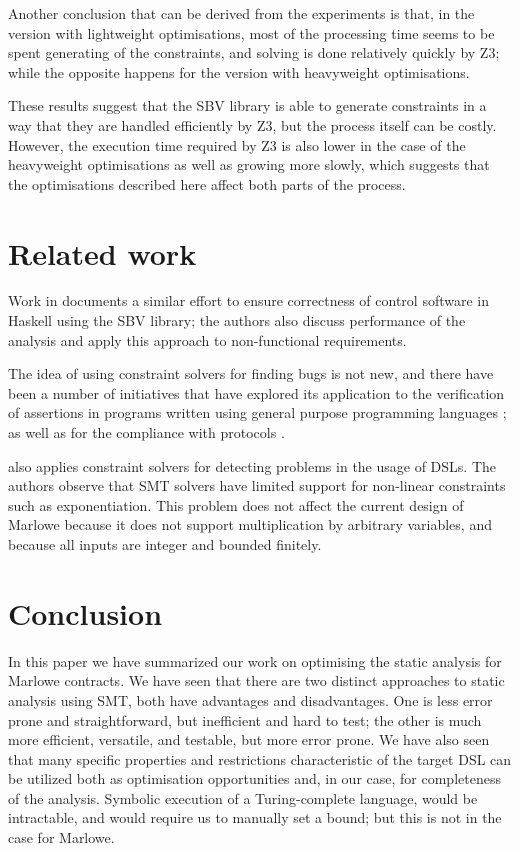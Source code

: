 \documentclass[english,runningheads]{llncs}
\begin{document}
Another conclusion that can be derived from the experiments is that, in the
version with lightweight optimisations, most of the processing time seems to be
spent generating of the constraints, and solving is done relatively
quickly by Z3; while the opposite happens for the version with heavyweight
optimisations.

These results suggest that the SBV library is able to generate constraints in a way
that they are handled efficiently by Z3, but the process itself can be costly. However, the  execution time required by Z3
is also lower in the case of the heavyweight optimisations as well as
growing more slowly, which suggests that the optimisations described here
affect both parts of the process.

\section{Related work}

Work in \cite{mokhov2019formal} documents a similar effort to ensure
correctness of control software in Haskell using the SBV library; the
authors also discuss performance of the analysis and apply this approach
to non-functional requirements.

The idea of using constraint solvers for finding bugs is not new,
and there have been a number of initiatives that have explored its
application to the verification of assertions in programs written
using general purpose programming languages \cite{gulwani2008program,jackson2000finding};
as well as for the compliance with protocols
\cite{ball2001automatically,xie2005saturn}.

\cite{keshishzadeh2013early} also applies constraint solvers for
detecting problems in the usage of DSLs. The authors observe that
SMT solvers have limited support for non-linear constraints such as
exponentiation. This problem does not affect the current design of
Marlowe because it does not support multiplication by arbitrary variables,
and because all inputs are integer and bounded finitely.




\section{Conclusion}

In this paper we have summarized our work
on optimising the static analysis for Marlowe contracts. We have seen
that there are two distinct approaches to static analysis using SMT,
both have advantages and disadvantages. One is less error prone and
straightforward, but inefficient and hard to test; the other 
is much more efficient, versatile, and testable, but more error prone.
We have also seen that many specific properties and restrictions characteristic
of the target DSL can be utilized both as optimisation opportunities
and, in our case, for completeness of the analysis. Symbolic execution
of a Turing-complete language, would be intractable,
and would require us to manually set a bound; but this is not in the
case for Marlowe.
\end{document}
